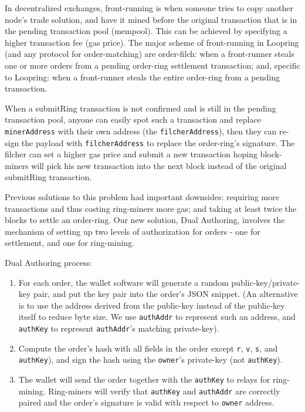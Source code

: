 \documentclass[UTF8,nofonts]{article}
\begin{document}
\begin{multicols}{2}
In decentralized exchanges, front-running is when someone tries to copy another node's trade solution, and have it mined before the original transaction that is in the pending transaction pool (mempool). This can be achieved by specifying a higher transaction fee (gas price). The major scheme of front-running in Loopring (and any protocol for order-matching) are order-filch: when a front-runner steals one or more orders from a pending order-ring settlement transaction; and, specific to Loopring: when a front-runner steals the entire order-ring from a pending transaction.


When a submitRing transaction is not confirmed and is still in the pending transaction pool, anyone can easily spot such a transaction and replace \verb|minerAddress| with their own address (the \verb|filcherAddress|), then they can re-sign the payload with \verb|filcherAddress| to replace the order-ring's signature. The filcher can set a higher gas price and submit a new transaction hoping block-miners will pick his new transaction into the next block instead of the original submitRing transaction.

Previous solutions to this problem had important downsides: requiring more transactions and thus costing ring-miners more gas; and taking at least twice the blocks to settle an order-ring.  Our new solution, Dual Authoring\cite{dualauthor}, involves the mechanism of setting up two levels of authorization for orders - one for settlement, and one for ring-mining.

Dual Authoring process:

\begin{enumerate}

	\item For each order, the wallet software will generate a random public-key/private-key pair, and put the key pair into the order's JSON snippet. (An alternative is to use the address derived from the public-key instead of the public-key itself to reduce byte size. We use \verb|authAddr| to represent such an address, and \verb|authKey| to represent \verb|authAddr|'s matching private-key).

	\item Compute the order's hash with all fields in the order except \verb|r|, \verb|v|, \verb|s|, and \verb|authKey|), and sign the hash using the \verb|owner|'s private-key (not \verb|authKey|).

	\item The wallet will send the order together with the \verb|authKey| to  relays for ring-mining. Ring-miners will verify that \verb|authKey| and \verb|authAddr| are correctly paired and the order's signature is valid with respect to \verb|owner| address.


\end{enumerate}
\end{multicols}
\end{document}
